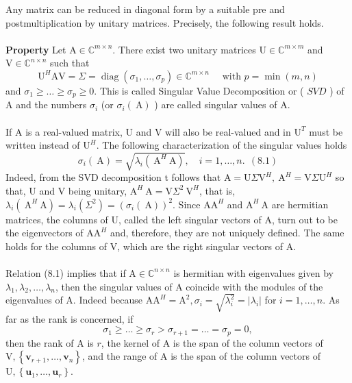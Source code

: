 \documentclass[11pt]{book}
\begin{document}
Any matrix can be reduced in diagonal form by a suitable pre and postmultiplication by unitary matrices. Precisely, the following result holds.\\ \\
\textbf{Property} Let $\mathrm{A} \in \mathbb{C}^{m \times n}$. There exist two unitary matrices $\mathrm{U} \in \mathbb{C}^{m \times m}$ and $\mathrm{V} \in \mathbb{C}^{n \times n}$ such that
$$
\mathrm{U}^H \mathrm{AV}=\Sigma=\operatorname{diag}\left(\sigma_1, \ldots, \sigma_p\right) \in \mathbb{C}^{m \times n} \quad \text { with } p=\min (m, n)
$$
and $\sigma_1 \geq \ldots \geq \sigma_p \geq 0$. This is called Singular Value Decomposition or ( $S V D$ ) of $\mathrm{A}$ and the numbers $\sigma_i$ (or $\sigma_i(\mathrm{~A})$ ) are called singular values of $\mathrm{A}$.\\ \\
If $\mathrm{A}$ is a real-valued matrix, $\mathrm{U}$ and $\mathrm{V}$ will also be real-valued and in $\mathrm{U}^T$ must be written instead of $\mathrm{U}^H$. The following characterization of the singular values holds
$$
\sigma_i(\mathrm{~A})=\sqrt{\lambda_i\left(\mathrm{~A}^H \mathrm{~A}\right)}, \quad i=1, \ldots, n . \ \ (8.1)
$$
Indeed, from the SVD decomposition t follows that $\mathrm{A}=\mathrm{U} \Sigma \mathrm{V}^H, \mathrm{~A}^H=\mathrm{V} \Sigma \mathrm{U}^H$ so that, $\mathrm{U}$ and $\mathrm{V}$ being unitary, $\mathrm{A}^H \mathrm{~A}=\mathrm{V} \Sigma^2 \mathrm{~V}^H$, that is, $\lambda_i\left(\mathrm{~A}^H \mathrm{~A}\right)=\lambda_i\left(\Sigma^2\right)=\left(\sigma_i(\mathrm{~A})\right)^2$. Since $\mathrm{AA}^H$ and $\mathrm{A}^H \mathrm{~A}$ are hermitian matrices, the columns of $\mathrm{U}$, called the left singular vectors of $\mathrm{A}$, turn out to be the eigenvectors of $\mathrm{AA}^H$ and, therefore, they are not uniquely defined. The same holds for the columns of $\mathrm{V}$, which are the right singular vectors of $\mathrm{A}$.\\ \\
Relation (8.1) implies that if $\mathrm{A} \in \mathbb{C}^{n \times n}$ is hermitian with eigenvalues given by $\lambda_1, \lambda_2, \ldots, \lambda_n$, then the singular values of A coincide with the modules of the eigenvalues of $\mathrm{A}$. Indeed because $\mathrm{AA}^H=\mathrm{A}^2, \sigma_i=\sqrt{\lambda_i^2}=\left|\lambda_i\right|$ for $i=1, \ldots, n$. As far as the rank is concerned, if
$$
\sigma_1 \geq \ldots \geq \sigma_r>\sigma_{r+1}=\ldots=\sigma_p=0,
$$
then the rank of A is $r$, the kernel of A is the span of the column vectors of $\mathrm{V},\left\{\mathbf{v}_{r+1}, \ldots, \mathbf{v}_n\right\}$, and the range of $\mathrm{A}$ is the span of the column vectors of $\mathrm{U},\left\{\mathbf{u}_1, \ldots, \mathbf{u}_r\right\}$.\\ \\
\end{document}
